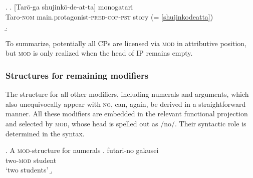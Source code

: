 \documentclass [output=book,colorlinks,citecolor=brown]{langscibook}
\begin{document}
\newpage

\ex. \label{shujinkodatta} \ag. [Tarō-ga shujinkō-de-at-ta] monogatari\\
Taro-\textsc{nom} main.protagonist-\textsc{pred-cop-pst} story (= \ref{shujinkodeatta})\\
\b. \hspace{-2cm} 

To summarize, potentially all CPs are licensed via \textsc{mod} in attributive position, but \textsc{mod} is only realized when the head of IP remains empty.

\subsubsection{Structures for remaining modifiers} \label{other mod}

The structure for all other modifiers, including numerals and arguments, which also unequivocally appear with \textsc{no}, can, again, be derived in a straightforward manner. All these modifiers are embedded in the relevant functional projection and selected by \textsc{mod}, whose head is spelled out as /no/. Their syntactic role is determined in the syntax. %

\newpage

\ex. A \textsc{mod}-structure for numerals
\ag. futari-no gakusei\\
two-\textsc{mod} student\\
`two students’
\b. 
\end{document}
